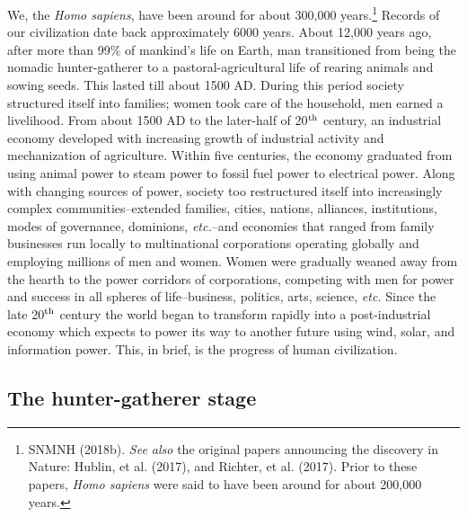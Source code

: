 \begin{multicols}{2}
We, the \textit{Homo sapiens}, have been around for about 300,000 years.\footnote{SNMNH (2018b). \textit{See also} the original papers announcing the discovery in Nature: Hublin, et al. (2017), and Richter, et al. (2017). Prior to these papers, \textit{Homo sapiens} were said to have been around for about 200,000 years.} Records of our civilization date back approximately 6000 years. About 12,000 years ago, after more than 99\% of mankind's life on Earth, man transitioned from being the nomadic hunter-gatherer to a pastoral-agricultural life of rearing animals and sowing seeds. This lasted till about 1500 AD. During this period society structured itself into families; women took care of the household, men earned a livelihood. From about 1500 AD to the later-half of 20$^{\rm th}$ century, an industrial economy developed with increasing growth of industrial activity and mechanization of agriculture. Within five centuries, the economy graduated from using animal power to steam power to fossil fuel power to electrical power. Along with changing sources of power, society too restructured itself into increasingly complex communities--extended families, cities, nations, alliances, institutions, modes of governance, dominions, \textit{etc.}--and economies that ranged from family businesses run locally to multinational corporations operating globally and employing millions of men and women. Women were gradually weaned away from the hearth to the power corridors of corporations, competing with men for power and success in all spheres of life--business, politics, arts, science, \textit{etc.} Since the late 20$^{\rm th}$ century the world began to transform rapidly into a post-industrial economy which expects to power its way to another future using wind, solar, and information power. This, in brief, is the progress of human civilization.\\[-15pt]

\subsection{The hunter-gatherer stage}


\end{multicols}
